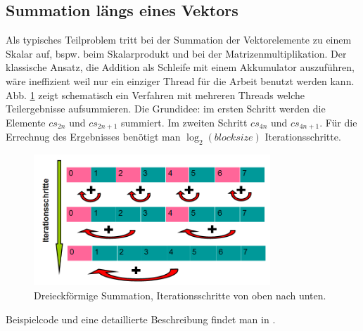 


\subsection{Summation längs eines Vektors}

Als typisches Teilproblem tritt bei der Summation der Vektorelemente zu
einem Skalar auf, bspw. beim Skalarprodukt und bei der Matrizenmultiplikation.
Der klassische Ansatz, die Addition als Schleife mit einem Akkumulator
auszuführen, wäre ineffizient weil nur ein einziger Thread für die
Arbeit benutzt werden kann.
Abb. \ref{Dreieck} zeigt schematisch ein Verfahren mit mehreren Threads
welche Teilergebnisse aufsummieren.
Die Grundidee: im ersten Schritt werden die Elemente
$cs_{2n}$ und $cs_{2n+1}$ summiert.
Im zweiten Schritt $cs_{4n}$ und $cs_{4n+1}$. Für die Errechnug
des Ergebnisses benötigt man $ \log_2(blocksize)$ Iterationsschritte.

\begin{figure}[htbp]
\includegraphics[width=3.5in]{../xby/pic//dreieck}
\caption{\label{Dreieck}Dreieckförmige Summation, Iterationsschritte von oben nach unten.}
\end{figure}

Beispielcode und eine detaillierte Beschreibung findet man in \cite{reduction}.

%
